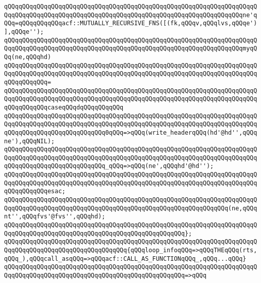 \verb|qQQqqQQqqQQqqQQqqQQqqQQqqQQqqQQqqQQqqQQqqQQqqQQqqQQqqQQqqQQqqQQqqQQqqQQqqQQqqQQqqQQqqQQqqQQqqQQqqQQqqQQqqQQqqQQqqQQqqQQqqQQqqQQqqQQqqQQqne'qQQq=qQQqqQQqqQQqacf::MUTUALLY_RECURSIVE_FNS([(fk,qQQqv,qQQqlvs,qQQqe')],qQQqe'');|\newline
\newline
\verb|qQQqqQQqqQQqqQQqqQQqqQQqqQQqqQQqqQQqqQQqqQQqqQQqqQQqqQQqqQQqqQQqqQQqqQQqqQQqqQQqqQQqqQQqqQQqqQQqqQQqqQQqqQQqqQQqqQQqqQQqqQQqqQQqqQQqqQQqmyqQQq(ne,qQQqhd)|\newline
\verb|qQQqqQQqqQQqqQQqqQQqqQQqqQQqqQQqqQQqqQQqqQQqqQQqqQQqqQQqqQQqqQQqqQQqqQQqqQQqqQQqqQQqqQQqqQQqqQQqqQQqqQQqqQQqqQQqqQQqqQQqqQQqqQQqqQQqqQQqqQQqqQQqqQQqqQQq=|\newline
\verb|qQQqqQQqqQQqqQQqqQQqqQQqqQQqqQQqqQQqqQQqqQQqqQQqqQQqqQQqqQQqqQQqqQQqqQQqqQQqqQQqqQQqqQQqqQQqqQQqqQQqqQQqqQQqqQQqqQQqqQQqqQQqqQQqqQQqqQQqqQQqqQQqqQQqqQQqcaseqQQqdqQQqqQQqqQQq|\newline
\verb|qQQqqQQqqQQqqQQqqQQqqQQqqQQqqQQqqQQqqQQqqQQqqQQqqQQqqQQqqQQqqQQqqQQqqQQqqQQqqQQqqQQqqQQqqQQqqQQqqQQqqQQqqQQqqQQqqQQqqQQqqQQqqQQqqQQqqQQqqQQqqQQqqQQqqQQqqQQqqQQqqQQqqQQq0qQQq=>qQQq(write_headerqQQq(hd'@hd'',qQQqne'),qQQqNIL);|\newline
\verb|qQQqqQQqqQQqqQQqqQQqqQQqqQQqqQQqqQQqqQQqqQQqqQQqqQQqqQQqqQQqqQQqqQQqqQQqqQQqqQQqqQQqqQQqqQQqqQQqqQQqqQQqqQQqqQQqqQQqqQQqqQQqqQQqqQQqqQQqqQQqqQQqqQQqqQQqqQQqqQQqqQQqqQQq_qQQq=>qQQq(ne',qQQqhd'@hd'');|\newline
\verb|qQQqqQQqqQQqqQQqqQQqqQQqqQQqqQQqqQQqqQQqqQQqqQQqqQQqqQQqqQQqqQQqqQQqqQQqqQQqqQQqqQQqqQQqqQQqqQQqqQQqqQQqqQQqqQQqqQQqqQQqqQQqqQQqqQQqqQQqqQQqqQQqqQQqqQQqesac;|\newline
\newline
\verb|qQQqqQQqqQQqqQQqqQQqqQQqqQQqqQQqqQQqqQQqqQQqqQQqqQQqqQQqqQQqqQQqqQQqqQQqqQQqqQQqqQQqqQQqqQQqqQQqqQQqqQQqqQQqqQQqqQQqqQQqqQQqqQQqqQQq(ne,qQQqnt'',qQQqfvs'@fvs'',qQQqhd);|\newline
\verb|qQQqqQQqqQQqqQQqqQQqqQQqqQQqqQQqqQQqqQQqqQQqqQQqqQQqqQQqqQQqqQQqqQQqqQQqqQQqqQQqqQQqqQQqqQQqqQQqqQQqqQQqqQQqqQQqqQQqqQQq};|\newline
\newline
\verb|qQQqqQQqqQQqqQQqqQQqqQQqqQQqqQQqqQQqqQQqqQQqqQQqqQQqqQQqqQQqqQQqqQQqqQQqqQQqqQQqqQQqqQQqqQQqqQQqqQQqqQQq{qQQqloop_infoqQQq=>qQQqTHEqQQq(rts,qQQq_),qQQqcall_asqQQq=>qQQqacf::CALL_AS_FUNCTIONqQQq_,qQQq...qQQq}|\newline
\verb|qQQqqQQqqQQqqQQqqQQqqQQqqQQqqQQqqQQqqQQqqQQqqQQqqQQqqQQqqQQqqQQqqQQqqQQqqQQqqQQqqQQqqQQqqQQqqQQqqQQqqQQqqQQqqQQqqQQqqQQq=>qQQq|\newline
